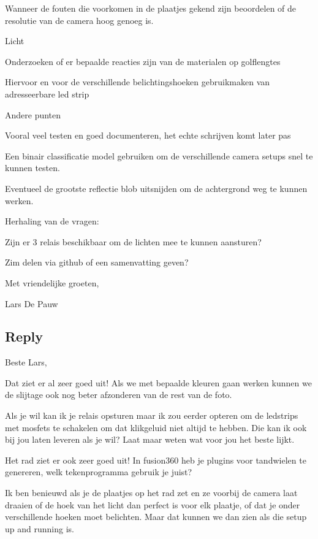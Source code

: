 \documentclass{article}
\begin{document}
Wanneer de fouten die voorkomen in de plaatjes gekend zijn beoordelen of de resolutie van de camera hoog genoeg is.

Licht

Onderzoeken of er bepaalde reacties zijn van de materialen op golflengtes

Hiervoor en voor de verschillende belichtingshoeken gebruikmaken van adresseerbare led strip

Andere punten

Vooral veel testen en goed documenteren, het echte schrijven komt later pas

Een binair classificatie model gebruiken om de verschillende camera setups snel te kunnen testen.

Eventueel de grootste reflectie blob uitsnijden om de achtergrond weg te kunnen werken.

 

Herhaling van de vragen:

Zijn er 3 relais beschikbaar om de lichten mee te kunnen aansturen?

Zim delen via github of een samenvatting geven?

 

 

Met vriendelijke groeten,

 

Lars De Pauw



\subsection{Reply}

Beste Lars,



Dat ziet er al zeer goed uit! Als we met bepaalde kleuren gaan werken kunnen we de slijtage ook nog beter afzonderen van de rest van de foto.



Als je wil kan ik je relais opsturen maar ik zou eerder opteren om de ledstrips met mosfets te schakelen om dat klikgeluid niet altijd te hebben. Die kan ik ook bij jou laten leveren als je wil? Laat maar weten wat voor jou het beste lijkt.



Het rad ziet er ook zeer goed uit! In fusion360 heb je plugins voor tandwielen te genereren, welk tekenprogramma gebruik je juist?



Ik ben benieuwd als je de plaatjes op het rad zet en ze voorbij de camera laat draaien of de hoek van het licht dan perfect is voor elk plaatje, of dat je onder verschillende hoeken moet belichten. Maar dat kunnen we dan zien als die setup up and running is.
\end{document}
